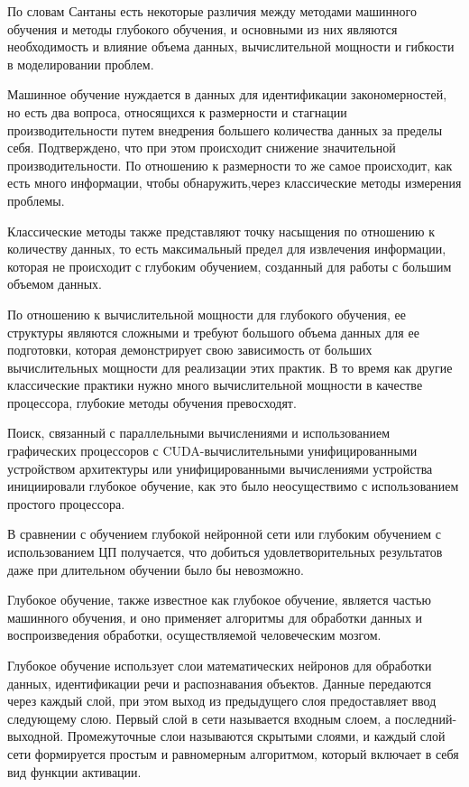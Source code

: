 По словам Сантаны есть некоторые различия между методами машинного обучения и методы глубокого обучения,
и основными из них являются необходимость и влияние объема данных,
вычислительной мощности и гибкости в моделировании проблем.

Машинное обучение нуждается в данных для идентификации закономерностей, но есть два вопроса,
относящихся к размерности и стагнации производительности путем внедрения большего количества данных за пределы себя.
Подтверждено, что при этом происходит снижение значительной производительности.
По отношению к размерности то же самое происходит, как есть много информации,
чтобы обнаружить,через классические методы измерения проблемы.


Классические методы также представляют точку насыщения по отношению к количеству данных,
то есть максимальный предел для извлечения информации, которая не происходит с глубоким обучением,
созданный для работы с большим объемом данных.

По отношению к вычислительной мощности для глубокого обучения,
ее структуры являются сложными и требуют большого объема данных для ее подготовки,
которая демонстрирует свою зависимость от больших вычислительных мощности для реализации этих практик.
В то время как другие классические практики нужно много вычислительной мощности в качестве процессора,
глубокие методы обучения превосходят.

Поиск, связанный с параллельными вычислениями и использованием графических процессоров с CUDA-вычислительными
унифицированными устройством архитектуры или унифицированными вычислениями устройства инициировали глубокое обучение,
как это было неосуществимо с использованием простого процессора.

В сравнении с обучением глубокой нейронной сети или глубоким обучением с использованием ЦП получается,
что добиться удовлетворительных результатов даже при длительном обучении было бы невозможно.

Глубокое обучение, также известное как глубокое обучение, является частью машинного обучения,
и оно применяет алгоритмы для обработки данных и воспроизведения обработки,
осуществляемой человеческим мозгом.

Глубокое обучение использует слои математических нейронов для обработки данных, идентификации речи и распознавания объектов.
Данные передаются через каждый слой, при этом выход из предыдущего слоя предоставляет ввод следующему слою.
Первый слой в сети называется входным слоем, а последний-выходной.
Промежуточные слои называются скрытыми слоями, и каждый слой сети формируется простым и равномерным алгоритмом,
который включает в себя вид функции активации.

